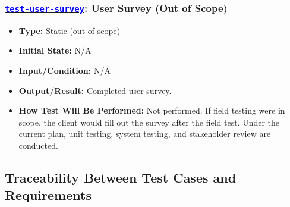 \documentclass[12pt, titlepage]{article}
\newcommand{\tid}[1]{\hyperlink{tid:#1}{\textcolor{blue}{\texttt{#1}}}}
\begin{document}
\subsubsection*{\tid{test-user-survey}: User Survey (Out of Scope)}
\begin{itemize}
  \item \textbf{Type:} Static (out of scope)
  \item \textbf{Initial State:} N/A
  \item \textbf{Input/Condition:} N/A
  \item \textbf{Output/Result:} Completed user survey.
  \item \textbf{How Test Will Be Performed:} Not performed. If field testing were in scope, the client would fill out the survey after the field test. Under the current plan, unit testing, system testing, and stakeholder review are conducted.
\end{itemize}

\subsection{Traceability Between Test Cases and Requirements}
\end{document}
